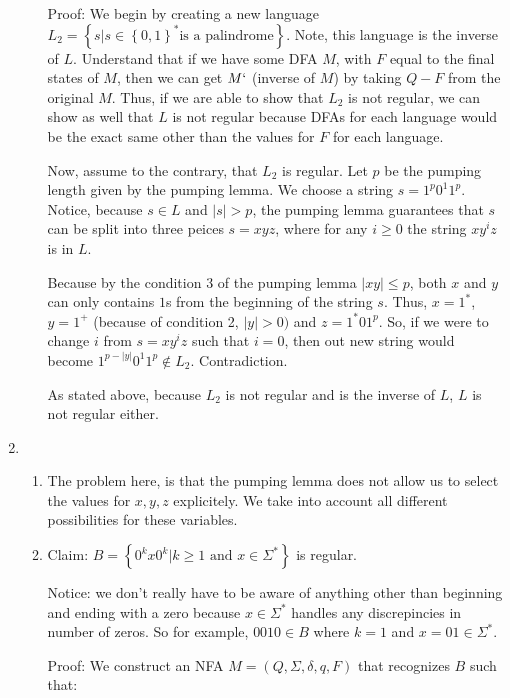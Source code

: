 \documentclass{article}
\newcommand{\set}[1]{{\left\{#1\right\}}}    %
\newcommand{\abs}[1]{\left\lvert #1 \right\rvert}
\begin{document}
\begin{enumerate}
\begin{enumerate}
                Proof: We begin by creating a new language $L_2 = \set{s|s\in\set{0,1}^* \text{is a palindrome}}$.
                Note, this language is the inverse of $L$.
                Understand that if we have some DFA $M$, with $F$ equal to the final states of $M$, then we can get $M`$ (inverse of $M$) by taking $Q - F$ from the original $M$.
                Thus, if we are able to show that $L_2$ is not regular, we can show as well that $L$ is not regular because DFAs for each language would be the exact same other than the values for $F$ for each language.

                Now, assume to the contrary, that $L_2$ is regular.
                Let $p$ be the pumping length given by the pumping lemma.
                We choose a string $s = 1^{p}0^{1}1^{p}$.
                Notice, because $s \in L$ and $\abs{s} > p$, the pumping lemma guarantees that $s$ can be split into three peices $s = xyz$, where for any $i \ge 0$ the string $xy^iz$ is in $L$.

                Because by the condition 3 of the pumping lemma $\abs{xy} \le p$, both $x$ and $y$ can only contains $1$s from the beginning of the string $s$.
                Thus, $x = 1^*$, $y = 1^+$ (because of condition 2, $\abs{y} > 0)$ and $z = 1^*01^p$.
                So, if we were to change $i$ from $s = xy^iz$ such that $i=0$, then out new string would become $1^{p-\abs{y}}0^{1}1^{p} \not\in L_2$. Contradiction.

                As stated above, because $L_2$ is not regular and is the inverse of $L$, $L$ is not regular either.
        \end{enumerate}
    \item %
        \begin{enumerate}
            \item
                The problem here, is that the pumping lemma does not allow us to select the values for $x,y,z$ explicitely.
                We take into account all different possibilities for these variables.
            \item
                Claim: $B = \set{0^kx0^k | k \ge 1 \text{ and } x \in \Sigma^*}$ is regular.

                Notice: we don't really have to be aware of anything other than beginning and ending with a zero because $x \in \Sigma^*$ handles any discrepincies in number of zeros.
                So for example, $0010 \in B$ where $k=1$ and $x = 01 \in \Sigma^*$.

                Proof: We construct an NFA $M=(Q,\Sigma,\delta,q,F)$ that recognizes $B$ such that:


\end{enumerate}
\end{enumerate}
\end{document}
